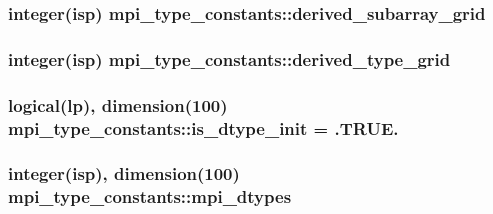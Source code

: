 \subsubsection[{\texorpdfstring{derived\+\_\+subarray\+\_\+grid}{derived_subarray_grid}}]{\setlength{\rightskip}{0pt plus 5cm}integer(isp) mpi\+\_\+type\+\_\+constants\+::derived\+\_\+subarray\+\_\+grid}\hypertarget{namespacempi__type__constants_ad3a88774f5b3d027503997955c593325}{}\label{namespacempi__type__constants_ad3a88774f5b3d027503997955c593325}
\subsubsection[{\texorpdfstring{derived\+\_\+type\+\_\+grid}{derived_type_grid}}]{\setlength{\rightskip}{0pt plus 5cm}integer(isp) mpi\+\_\+type\+\_\+constants\+::derived\+\_\+type\+\_\+grid}\hypertarget{namespacempi__type__constants_a4463600d2b1297b8b25562589ae2ed28}{}\label{namespacempi__type__constants_a4463600d2b1297b8b25562589ae2ed28}
\subsubsection[{\texorpdfstring{is\+\_\+dtype\+\_\+init}{is_dtype_init}}]{\setlength{\rightskip}{0pt plus 5cm}logical(lp), dimension(100) mpi\+\_\+type\+\_\+constants\+::is\+\_\+dtype\+\_\+init = .T\+R\+U\+E.}\hypertarget{namespacempi__type__constants_a9a7750e86add91334ea455e5eb1516e6}{}\label{namespacempi__type__constants_a9a7750e86add91334ea455e5eb1516e6}
\subsubsection[{\texorpdfstring{mpi\+\_\+dtypes}{mpi_dtypes}}]{\setlength{\rightskip}{0pt plus 5cm}integer(isp), dimension(100) mpi\+\_\+type\+\_\+constants\+::mpi\+\_\+dtypes}\hypertarget{namespacempi__type__constants_a17a815d34db410fbd4e9591e3a0fdd96}{}\label{namespacempi__type__constants_a17a815d34db410fbd4e9591e3a0fdd96}
